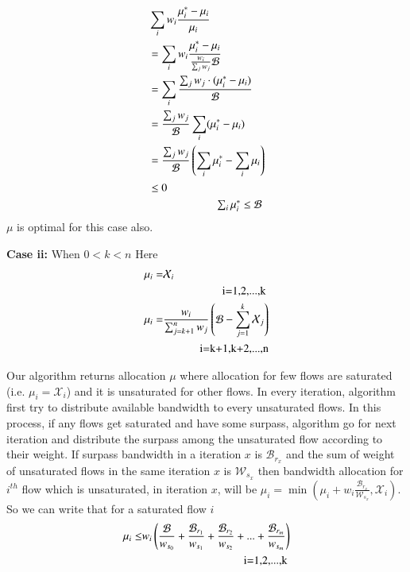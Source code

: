 \begin{equation}
\begin{split}
&\sum_i w_i \frac{\mu_i^* - \mu_i}{\mu_i} \\
&= \sum_i w_i \frac{\mu_i^* - \mu_i}{\frac{w_i}{\sum_{j}w_j} \mathcal{B}} \\
&= \sum_i  \frac{\sum_{j}w_j \cdot (\mu_i^* - \mu_i)}{\mathcal{B}} \\
&= \frac{\sum_{j}w_j}{\mathcal{B}} \sum_i (\mu_i^* - \mu_i)\\
&= \frac{\sum_{j}w_j}{\mathcal{B}} \left( \sum_i \mu_i^* - \sum_i \mu_i \right) \\
&\le 0 \\
& \omit \hfill \text{$\sum_i \mu_i^* \le \mathcal{B}$} \\
\end{split}
\end{equation}
$\mu$ is optimal for this case also.

{\bf Case ii:} When $0<k<n$
Here
\begin{equation}
\label{eqn:case3-1}
\begin{split}
\mu_i =& \mathcal{X}_i \\ & \omit\hfill \text{} i=1,2,...,k \\
\mu_i =& \frac{w_i}{\sum_{j=k+1}^{n} w_j} \left(\mathcal{B}-\sum_{j=1}^{k}\mathcal{X}_j\right) \\ & \omit\hfill \text{} i=k+1,k+2,...,n\\
\end{split}
\end{equation}

Our algorithm returns allocation $\mu$ where allocation for few flows are saturated (i.e. $\mu_i = \mathcal{X}_i$) and it is unsaturated for other flows. In every iteration, algorithm first try to distribute available bandwidth to every unsaturated flows. In this process, if any flows get saturated and have some surpass, algorithm go for next iteration and distribute the surpass among the unsaturated flow according to their weight. If surpass bandwidth in a iteration $x$ is $\mathcal{B}_{r_x}$ and the sum of weight of unsaturated flows in the same iteration $x$ is $\mathcal{W}_{s_x}$ then bandwidth allocation for $i^{th}$ flow which is unsaturated, in iteration $x$, will be $\mu_i = \min\left( \mu_i + w_i\frac{\mathcal{B}_{r_x}}{\mathcal{W}_{s_x}}, \mathcal{X}_i \right)$. So we can write that for a saturated flow $i$ 
\begin{equation}
\label{eqn:case3-2}
\begin{split}
\mu_i \le& w_i \left( \frac{\mathcal{B}}{w_{s_0}} + \frac{\mathcal{B}_{r_1}}{w_{s_1}} + \frac{\mathcal{B}_{r_2}}{w_{s_2}} + ... + \frac{\mathcal{B}_{r_m}}{w_{s_m}} \right) \\ 
& \omit\hfill \text{} i=1,2,...,k \\
\end{split}
\end{equation}

